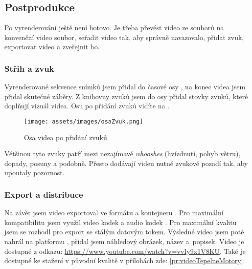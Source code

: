 \subsection{Postprodukce}
Po vyrenderování ještě není hotovo. Je třeba převést video ze souborů  na konvenční video soubor, seřadit video tak, aby správně navazovalo, přidat zvuk, exportovat video a zveřejnit ho.
\subsubsection{Střih a zvuk}
{Vyrenderované sekvence snímků jsem přidal do časové osy , na konec videa jsem přidal skutečné záběry.}\odst
{Z knihovny zvuků  jsem do osy přidal stovky zvuků, které doplňují vizuál videa. Osu po přidání zvuků vidíte na .}
\begin{figure}[H]
    \centering
    \texttt{[image: assets/images/osaZvuk.png]}
    \caption{Osa videa po přidání zvuků \jaObr}
    \label{obr:osaZvuk}
\end{figure}
{Většinou tyto zvuky patří mezi nezajímavé \textit{whooshes} (hvízdnutí, pohyb větru), dopady, posuny a podobně. Přesto dodávají videu nutné zvukové pozadí tak, aby upoutaly pozornost.}
\subsubsection{Export a distribuce}
{Na závěr jsem video exportoval ve formátu  a kontejneru . Pro maximální kompatibilitu jsem využil video kodek  a audio kodek . Pro maximální kvalitu jsem se rozhodl pro export se stálým datovým tokem.}\odst
{Výsledné video jsem poté nahrál na platformu , přidal jsem náhledový obrázek, název a~popisek. Video je dostupné z odkazu: \href{https://www.youtube.com/watch?v=vvIy9x1V8KU}{https://www.youtube.com/watch?v=vvIy9x1V8KU}. Také je dostupné ke stažení v původní kvalitě v přílohách zde: \ref{pr:videoTepelneMotory}.}